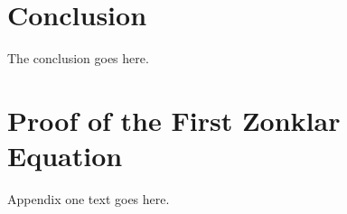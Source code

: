 \documentclass[journal]{IEEEtran}
\begin{document}




\section{Conclusion}
The conclusion goes here.






%


\appendices
\section{Proof of the First Zonklar Equation}
Appendix one text goes here.

\end{document}
